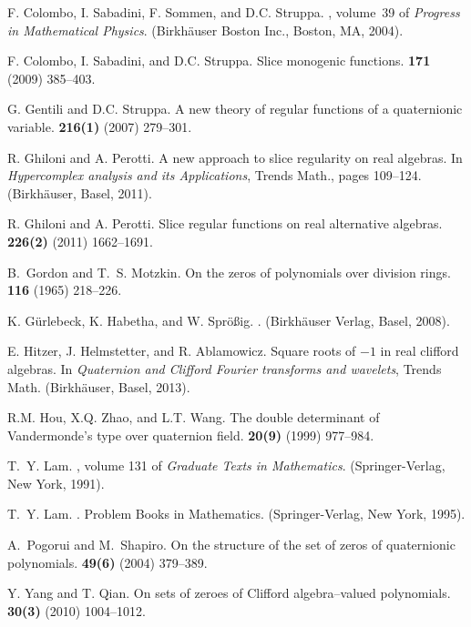 \documentclass[a4paper,11pt]{amsart}
\begin{document}
\begin{thebibliography}{10}

F. Colombo, I. Sabadini, F. Sommen, and D.C. Struppa.
,
  volume~39 of {\em Progress in Mathematical Physics}.
\newblock (Birkh\"auser Boston Inc., Boston, MA, 2004).

F. Colombo, I. Sabadini, and D.C. Struppa.
\newblock Slice monogenic functions.
 {\bf 171} (2009) 385--403.

G. Gentili and D.C. Struppa.
\newblock A new theory of regular functions of a quaternionic variable.
 {\bf 216(1)} (2007) 279--301.

R. Ghiloni and A. Perotti.
\newblock A new approach to slice regularity on real algebras.
\newblock In {\em Hypercomplex analysis and its Applications}, Trends Math.,
  pages 109--124. (Birkh\"auser, Basel, 2011).

R. Ghiloni and A. Perotti.
\newblock Slice regular functions on real alternative algebras.
  {\bf 226(2)} (2011) 1662--1691.

B.~Gordon and T.~S. Motzkin.
\newblock On the zeros of polynomials over division rings.
  {\bf 116} (1965) 218--226.

K. G{\"u}rlebeck, K. Habetha, and W. Spr{\"o}{\ss}ig.
.
\newblock (Birkh\"auser Verlag, Basel, 2008).

E. Hitzer, J. Helmstetter, and R. Ablamowicz.
\newblock Square roots of $-1$ in real clifford algebras.
\newblock In {\em Quaternion and Clifford Fourier transforms and wavelets},
  Trends Math. (Birkh\"auser, Basel, 2013).

R.M. Hou, X.Q. Zhao, and L.T. Wang.
\newblock The double determinant of {V}andermonde's type over quaternion field.
 {\bf 20(9)} (1999) 977--984.

T.~Y. Lam.
, volume 131 of {\em
  Graduate Texts in Mathematics}.
\newblock (Springer-Verlag, New York, 1991).

T.~Y. Lam.
.
\newblock Problem Books in Mathematics. (Springer-Verlag, New York, 1995).

A.~Pogorui and M.~Shapiro.
\newblock On the structure of the set of zeros of quaternionic polynomials.
 {\bf 49(6)} (2004) 379--389.

Y. Yang and T. Qian.
\newblock On sets of zeroes of {C}lifford algebra--valued polynomials.
 {\bf 30(3)} (2010) 1004--1012.

\end{thebibliography}
\end{document}
